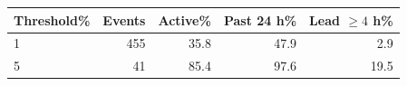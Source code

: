 \begin{tabular}{lrrrr}
\toprule
Threshold\% & Events & Active\% & Past 24 h\% & Lead $\ge4$ h\% \\
\midrule
1 & 455 & 35.8 & 47.9 & 2.9 \\
5 & 41 & 85.4 & 97.6 & 19.5 \\
\bottomrule
\end{tabular}
